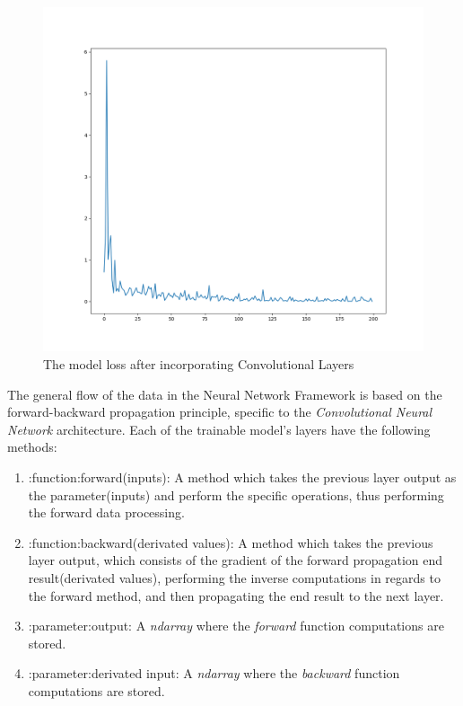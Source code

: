 \begin{figure}[H]
	\centering
	\includegraphics[width = 5.5in]{images/metrics.png}
	\caption{The model loss after incorporating Convolutional Layers}
\label{good_metrics}
\end{figure}


The general flow of the data in the Neural Network Framework is based on the forward-backward propagation principle,
specific to the \textit{Convolutional Neural Network} architecture.
Each of the trainable model's layers have the following methods:

\begin{enumerate}
	\item :function:forward(inputs): A method which takes the previous layer output as the parameter(inputs)
	and perform the specific operations, thus performing the forward data processing.
	\item :function:backward(derivated values): A method which takes the previous layer output, which consists
	of the gradient of the forward propagation end result(derivated values), performing the inverse
	computations in regards to the forward method, and then propagating the end result to the next layer.
	\item :parameter:output: A \textit{ndarray} where the \textit{forward} function computations are stored.
	\item :parameter:derivated input: A \textit{ndarray} where the \textit{backward} function computations are stored.

\end{enumerate}

